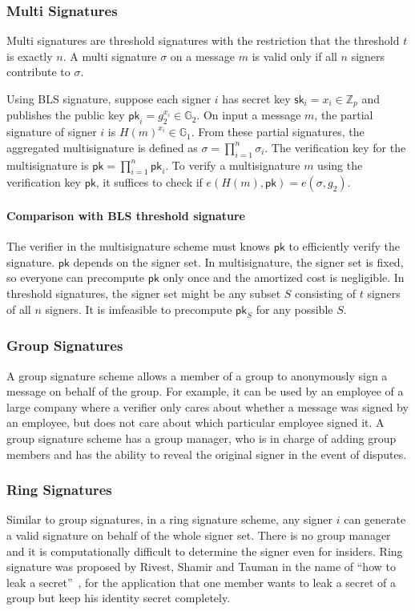 \subsubsection{Multi Signatures} \label{subsubsec:multisig}
Multi signatures are threshold signatures with the restriction that the threshold $t$ is exactly $n$. A multi signature $\sigma$ on a message $m$ is valid only if all $n$ signers contribute to $\sigma$. 

Using BLS signature, suppose each signer $i$ has secret key $\mathsf{sk}_i = x_i\in \mathbb{Z}_p$ and publishes the public key $\mathsf{pk}_i = g_2^{x_i}\in \mathbb{G}_2$. On input a message $m$, the partial signature of signer $i$ is $H(m)^{x_i} \in \mathbb{G}_1$. From these partial signatures, the aggregated multisignature is defined as $\sigma = \prod_{i=1}^n \sigma_i$. The verification key for the multisignature is $\mathsf{pk} = \prod_{i=1}^n \mathsf{pk}_i$. To verify a multisignature $m$ using the verification key $\mathsf{pk}$, it suffices to check if $e(H(m), \mathsf{pk}) = e(\sigma, g_2)$. 

\paragraph{Comparison with BLS threshold signature} The verifier in the multisignature scheme must knows $\mathsf{pk}$ to efficiently verify the signature. $\mathsf{pk}$ depends on the signer set. In multisignature, the signer set is fixed, so everyone can precompute $\mathsf{pk}$ only once and the amortized cost is negligible. In threshold signatures, the signer set might be any subset $S$ consisting of $t$ signers of all $n$ signers. It is imfeasible to precompute $\mathsf{pk}_S$ for any possible $S$. 

\subsubsection{Group Signatures} 
A group signature scheme allows a member of a group to anonymously sign a message on behalf of the group. For example, it can be used by an employee of a large company where a verifier only cares about whether a message was signed by an employee, but does not care about which particular employee signed it. A group signature scheme has a group manager, who is in charge of adding group members and has the ability to reveal the original signer in the event of disputes. 

\subsubsection{Ring Signatures} 
Similar to group signatures, in a ring signature scheme, any signer $i$ can generate a valid signature on behalf of the whole signer set. There is no group manager and it is computationally difficult to determine the signer even for insiders. Ring signature was proposed by Rivest, Shamir and Tauman in the name of ``how to leak a secret''~\cite{DBLP:conf/asiacrypt/RivestST01}, for the application that one member wants to leak a secret of a group but keep his identity secret completely. 


